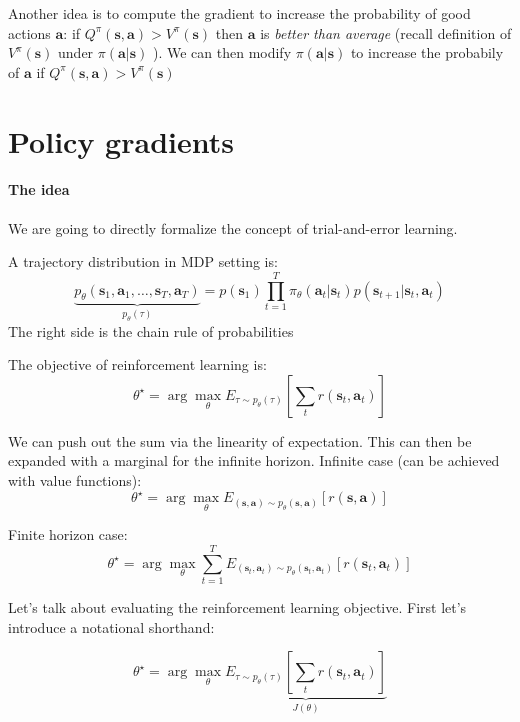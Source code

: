 \documentclass{report}
\newcommand{\argmax}{\arg\!\max}
\begin{document}
Another idea is to compute the gradient to increase the probability of good actions $\bm{a}$:
if $ Q^\pi(\bm{s}, \bm{a}) > V^\pi(\bm{s})$ then $\bm{a}$ is \textit{better than average} (recall definition of $V^\pi(\bm{s})$ under $\pi(\bm{a}|\bm{s}) $  ).
We can then modify $\pi(\bm{a}|\bm{s})$ to increase the probabily of $\bm{a}$ if $ Q^\pi(\bm{s}, \bm{a}) > V^\pi(\bm{s})$


\chapter{Policy gradients}
\subsubsection{The idea} We are going to directly formalize the concept of trial-and-error learning.


 A trajectory distribution in MDP setting is:
 \begin{equation}
 		\underbrace{p_\theta(\bm{s}_1, \bm{a}_1, \dots, \bm{s}_T, \bm{a}_T)}_{p_\theta(\tau)} = p(\bm{s}_1) \prod^{T}_{t=1} \pi_{\theta} (\bm{a}_t | \bm{s}_t) p (\bm{s}_{t+1} | \bm{s}_t, \bm{a}_t)
 \end{equation}
The right side is the chain rule of probabilities

The objective of reinforcement learning is:
\begin{equation}
		\theta^\star = \argmax_\theta E_{\tau \sim p_\theta (\tau)} \left [ \sum_t r(\bm{s}_t, \bm{a}_t) \right ]
\end{equation}

We can push out the sum via the linearity of expectation.
This can then be expanded with a marginal for the infinite horizon.
Infinite case (can be achieved with value functions):
\begin{equation}		
		\theta^\star = \argmax_\theta E_{(\bm{s}, \bm{a}) \sim p_\theta (\bm{s}, \bm{a})} \left [r(\bm{s}, \bm{a}) \right]
\end{equation}

Finite horizon case:
\begin{equation}		
		\theta^\star = \argmax_\theta \sum^{T}_{t=1}  E_{(\bm{s}_t, \bm{a}_t) \sim p_\theta (\bm{s}_t, \bm{a}_t)} \left [ r(\bm{s}_t, \bm{a}_t) \right]
\end{equation}


Let's talk about evaluating the reinforcement learning objective.
First let's introduce a notational shorthand:

\begin{equation}
		\theta^\star = \argmax_\theta \underbrace{E_{\tau \sim p_\theta (\tau)} \left [ \sum_t r(\bm{s}_t, \bm{a}_t) \right ]}_{J(\theta)}
\end{equation}
\end{document}
